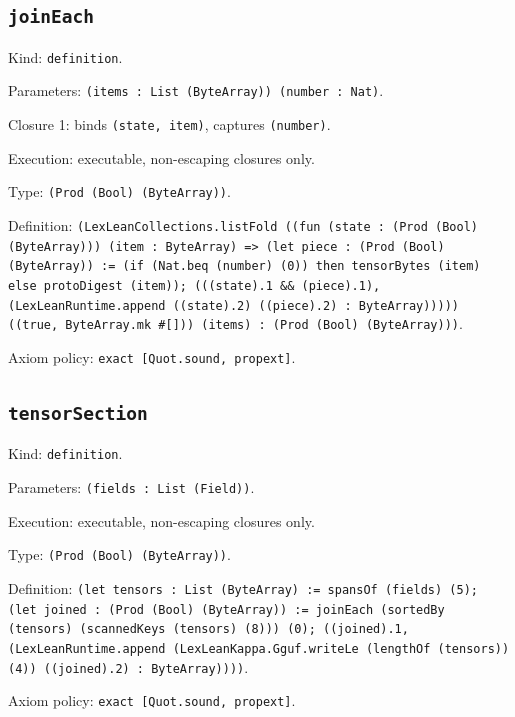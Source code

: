 \documentclass[11pt]{article}
\begin{document}
\subsection*{\texttt{joinEach}}
\noindent Kind: \texttt{definition}.\par
\noindent Parameters: \texttt{(items : List (ByteArray)) (number : Nat)}.\par
\noindent Closure 1: binds \texttt{(state, item)}, captures \texttt{(number)}.\par
\noindent Execution: executable, non-escaping closures only.\par
\noindent Type: \texttt{(Prod (Bool) (ByteArray))}.\par
\noindent Definition: \texttt{(LexLeanCollections.listFold ((fun (state : (Prod (Bool) (ByteArray))) (item : ByteArray) => (let piece : (Prod (Bool) (ByteArray)) := (if (Nat.beq (number) (0)) then tensorBytes (item) else protoDigest (item)); (((state).1 \&\& (piece).1), (LexLeanRuntime.append ((state).2) ((piece).2) : ByteArray))))) ((true, ByteArray.mk \#[])) (items) : (Prod (Bool) (ByteArray)))}.\par
\noindent Axiom policy: \texttt{exact [Quot.sound, propext]}.\par
\subsection*{\texttt{tensorSection}}
\noindent Kind: \texttt{definition}.\par
\noindent Parameters: \texttt{(fields : List (Field))}.\par
\noindent Execution: executable, non-escaping closures only.\par
\noindent Type: \texttt{(Prod (Bool) (ByteArray))}.\par
\noindent Definition: \texttt{(let tensors : List (ByteArray) := spansOf (fields) (5); (let joined : (Prod (Bool) (ByteArray)) := joinEach (sortedBy (tensors) (scannedKeys (tensors) (8))) (0); ((joined).1, (LexLeanRuntime.append (LexLeanKappa.Gguf.writeLe (lengthOf (tensors)) (4)) ((joined).2) : ByteArray))))}.\par
\noindent Axiom policy: \texttt{exact [Quot.sound, propext]}.\par
\end{document}
